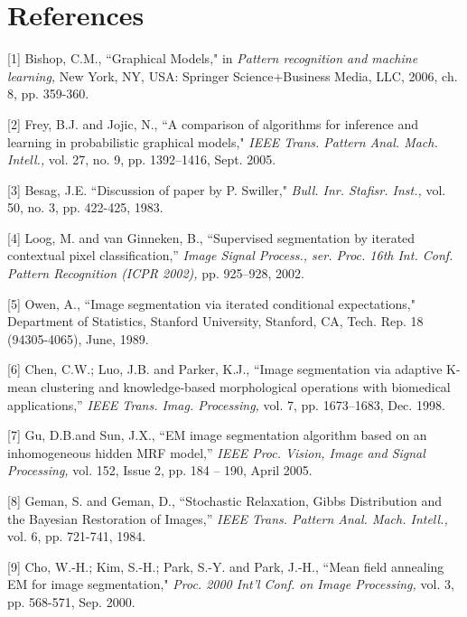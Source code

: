 \documentclass{article} %
\begin{document}
\section{References}
\small{
[1] Bishop, C.M., ``Graphical Models," in \textit{Pattern recognition and machine learning,} New York, NY, USA: Springer Science+Business Media, LLC, 2006, ch. 8, pp. 359-360.

[2] Frey, B.J. and Jojic, N., ``A comparison of algorithms for inference and learning in probabilistic graphical models," \textit{IEEE Trans. Pattern Anal. Mach. Intell.,} vol. 27, no. 9, pp. 1392–1416, Sept. 2005.

[3] Besag, J.E. ``Discussion of paper by P. Swiller," \textit{Bull. Inr. Stafisr. Inst.,} vol. 50, no. 3, pp. 422-425, 1983.

[4] Loog, M. and van Ginneken, B., ``Supervised segmentation by iterated contextual pixel classification,” \textit{Image Signal Process., ser. Proc. 16th Int. Conf. Pattern Recognition (ICPR 2002),} pp. 925–928, 2002.

[5] Owen, A., ``Image segmentation via iterated conditional expectations," Department of Statistics, Stanford University, Stanford, CA, Tech. Rep. 18 (94305-4065), June, 1989.

[6] Chen, C.W.; Luo, J.B. and Parker, K.J., ``Image segmentation via adaptive K-mean clustering and knowledge-based morphological operations with biomedical applications,” \textit{IEEE Trans. Imag. Processing,} vol. 7, pp. 1673–1683, Dec. 1998.

[7] Gu, D.B.and Sun, J.X., ``EM image segmentation algorithm based on an inhomogeneous hidden MRF model,” \textit{IEEE Proc. Vision, Image and Signal Processing,} vol. 152, Issue 2, pp. 184 – 190, April 2005.

[8] Geman, S. and Geman, D., ``Stochastic Relaxation, Gibbs Distribution and the Bayesian Restoration of Images,” \textit{IEEE Trans. Pattern Anal. Mach. Intell.,} vol. 6, pp. 721-741, 1984.

[9] Cho, W.-H.; Kim, S.-H.; Park, S.-Y. and Park, J.-H., ``Mean field annealing EM for image segmentation," \textit{Proc. 2000 Int’l Conf. on Image Processing,} vol. 3, pp. 568-571, Sep. 2000.

}
\end{document}
